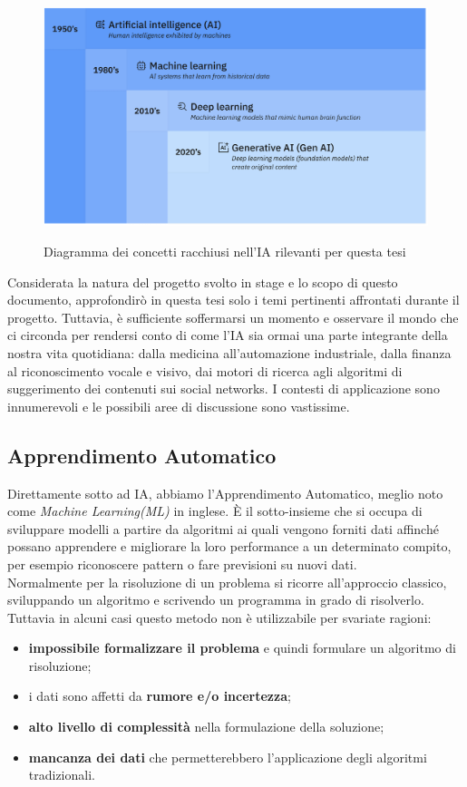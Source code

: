 \begin{figure}[H]
    \centering
    \includegraphics[alt={Diagramma dei concetti racchiusi nalla scienza dell'AI}, width=1\columnwidth]{img/diagram-ai-ml-dl-genai.png}
    \caption{Diagramma dei concetti racchiusi nell'IA rilevanti per questa tesi}
    \label{fig:diagram-ai-sub-concepts}
\end{figure}

Considerata la natura del progetto svolto in stage e lo scopo di questo documento, approfondirò in questa tesi solo i temi pertinenti affrontati durante il progetto. Tuttavia, è sufficiente soffermarsi un momento e osservare il mondo che ci circonda per rendersi conto di come l'IA sia ormai una parte integrante della nostra vita quotidiana: dalla medicina all'automazione industriale, dalla finanza al riconoscimento vocale e visivo, dai motori di ricerca agli algoritmi di suggerimento dei contenuti sui social networks. I contesti di applicazione sono innumerevoli e le possibili aree di discussione sono vastissime.


\subsection{Apprendimento Automatico}

Direttamente sotto ad IA, abbiamo l'Apprendimento Automatico, meglio noto come \textit{Machine Learning(ML)} in inglese. È il sotto-insieme che si occupa di sviluppare modelli a partire da algoritmi ai quali vengono forniti dati affinché possano apprendere e migliorare la loro performance a un determinato compito, per esempio riconoscere pattern o fare previsioni su nuovi dati. \\
Normalmente per la risoluzione di un problema si ricorre all'approccio classico, sviluppando un algoritmo e scrivendo un programma in grado di risolverlo. Tuttavia in alcuni casi questo metodo non è utilizzabile per svariate ragioni:
\begin{itemize}
    \item \textbf{impossibile formalizzare il problema} e quindi formulare un algoritmo di risoluzione;
    \item i dati sono affetti da \textbf{rumore e/o incertezza};
    \item \textbf{alto livello di complessità} nella formulazione della soluzione;
    \item \textbf{mancanza dei dati} che permetterebbero l'applicazione degli algoritmi tradizionali.
\end{itemize}

